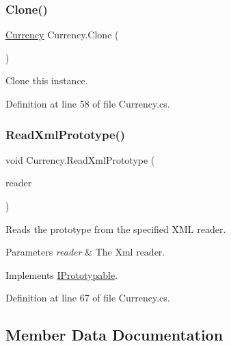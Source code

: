 \subsubsection{\texorpdfstring{Clone()}{Clone()}}
{\footnotesize\ttfamily \hyperlink{class_currency}{Currency} Currency.\+Clone (\begin{DoxyParamCaption}{ }\end{DoxyParamCaption})}



Clone this instance. 



Definition at line 58 of file Currency.\+cs.

\mbox{\label{class_currency_a353f4810761ac68141a62c78fa248fc4}} 
\subsubsection{\texorpdfstring{Read\+Xml\+Prototype()}{ReadXmlPrototype()}}
{\footnotesize\ttfamily void Currency.\+Read\+Xml\+Prototype (\begin{DoxyParamCaption}\item[{Xml\+Reader}]{reader }\end{DoxyParamCaption})}



Reads the prototype from the specified X\+ML reader. 


\begin{DoxyParams}{Parameters}
{\em reader} & The Xml reader.\\
\hline
\end{DoxyParams}


Implements \hyperlink{interface_i_prototypable_a024d752c4be655a7166db5718f1fad6a}{I\+Prototypable}.



Definition at line 67 of file Currency.\+cs.



\subsection{Member Data Documentation}
\mbox{\label{class_currency_a6fe7cdb92b7359c5cf462d0691d69e2c}} 

